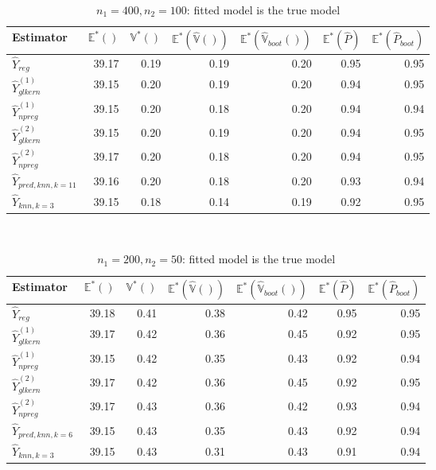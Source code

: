 \documentclass[a4paper,12pt,leqno, titlepage]{article}
\newcommand{\EX}{\mathbb{E}}
\newcommand{\VAR}{\mathbb{V}}
\begin{document}
\begin{table}[h]
\small
\centering
\caption{$n_1=400,n_2=100$: fitted model is the true model }\label{simul1}\\[0.5cm]
\begin{tabular}{lrrrrrr}
  \hline
Estimator & $\EX^*()$ & $\VAR^*()$ & $\EX^*(\hat{\VAR}())$ & $\EX^*(\hat{\VAR}_{boot}())$ & $\EX^*(\hat{P})$ & $\EX^*(\hat{P}_{boot})$ \\ \hline\hline

$\hat{Y}_{reg}$             & 39.17 & 0.19 & 0.19 &0.20  &0.95  & 0.95  \\ \hline
$\hat{Y}^{(1)}_{glkern}$    & 39.15 & 0.20 & 0.19 &0.20  &0.94  & 0.95  \\
$\hat{Y}^{(1)}_{npreg}$     & 39.15 & 0.20 & 0.18 &0.20  &0.94  & 0.94   \\ \hline
$\hat{Y}^{(2)}_{glkern}$    & 39.15 & 0.20 & 0.19 &0.20  &0.94  & 0.95  \\
$\hat{Y}^{(2)}_{npreg}$     & 39.17 & 0.20 & 0.18 &0.20  &0.94  & 0.95  \\ \hline
$\hat{Y}_{pred,knn,k=11}$   & 39.16 & 0.20 & 0.18 &0.20  &0.93  & 0.94  \\
$\hat{Y}_{knn,k=3}$         & 39.15 & 0.18 & 0.14 &0.19  &0.92  & 0.95  \\ \hline \hline
\end{tabular}
\end{table}

\begin{table}[h]
\small
\centering
\caption{$n_1=200,n_2=50$: fitted model is the true model }\label{simul2}\\[0.5cm]
\begin{tabular}{lrrrrrr}
  \hline
Estimator  & $\EX^*()$ & $\VAR^*()$ & $\EX^*(\hat{\VAR}())$ & $\EX^*(\hat{\VAR}_{boot}())$
& $\EX^*(\hat{P})$ &  $\EX^*(\hat{P}_{boot})$\\
  \hline\hline

$\hat{Y}_{reg}$             & 39.18 & 0.41 & 0.38 & 0.42       &0.95  & 0.95 \\ \hline
$\hat{Y}^{(1)}_{glkern}$    & 39.17 & 0.42 & 0.36 & 0.45       &0.92  & 0.95\\
$\hat{Y}^{(1)}_{npreg}$     & 39.15 & 0.42 & 0.35 & 0.43       &0.92  & 0.94   \\ \hline
$\hat{Y}^{(2)}_{glkern}$    & 39.17 & 0.42 & 0.36 & 0.45       &0.92  & 0.95 \\
$\hat{Y}^{(2)}_{npreg}$     & 39.17 & 0.43 & 0.36 & 0.42       &0.93  & 0.94   \\ \hline
$\hat{Y}_{pred,knn,k=6}$    & 39.15 & 0.43 & 0.35 & 0.43       &0.92  & 0.94\\
$\hat{Y}_{knn,k=3}$         & 39.15 & 0.43 & 0.31 & 0.43       &0.91  & 0.94  \\ \hline \hline
\end{tabular}
\end{table}
\end{document}
